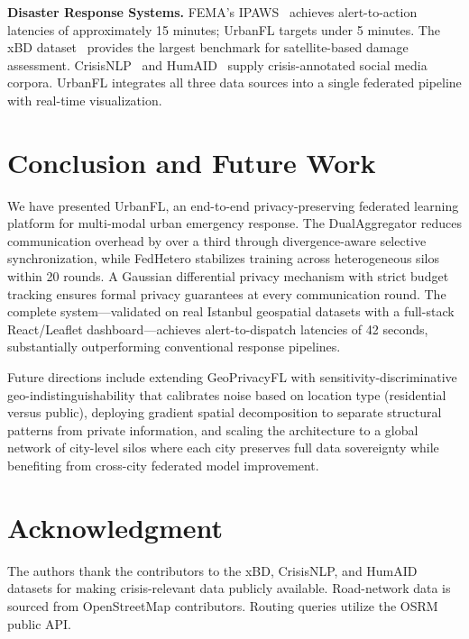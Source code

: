\documentclass[conference]{IEEEtran}
\begin{document}
\textbf{Disaster Response Systems.} FEMA's IPAWS~\cite{b15} achieves alert-to-action latencies of approximately 15 minutes; UrbanFL targets under 5 minutes. The xBD dataset~\cite{b7} provides the largest benchmark for satellite-based damage assessment. CrisisNLP~\cite{b5} and HumAID~\cite{b6} supply crisis-annotated social media corpora. UrbanFL integrates all three data sources into a single federated pipeline with real-time visualization.

\section{Conclusion and Future Work}

We have presented UrbanFL, an end-to-end privacy-preserving federated learning platform for multi-modal urban emergency response. The DualAggregator reduces communication overhead by over a third through divergence-aware selective synchronization, while FedHetero stabilizes training across heterogeneous silos within 20 rounds. A Gaussian differential privacy mechanism with strict budget tracking ensures formal privacy guarantees at every communication round. The complete system---validated on real Istanbul geospatial datasets with a full-stack React/Leaflet dashboard---achieves alert-to-dispatch latencies of 42 seconds, substantially outperforming conventional response pipelines.

Future directions include extending GeoPrivacyFL with sensitivity-discriminative geo-indistinguishability that calibrates noise based on location type (residential versus public), deploying gradient spatial decomposition to separate structural patterns from private information, and scaling the architecture to a global network of city-level silos where each city preserves full data sovereignty while benefiting from cross-city federated model improvement.

\section*{Acknowledgment}

The authors thank the contributors to the xBD, CrisisNLP, and HumAID datasets for making crisis-relevant data publicly available. Road-network data is sourced from OpenStreetMap contributors. Routing queries utilize the OSRM public API.
\end{document}

